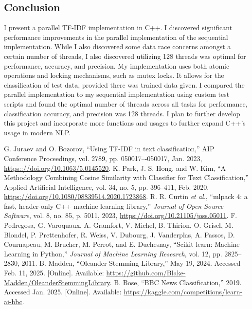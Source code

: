 \documentclass[conference]{IEEEtran}
\begin{document}
\subsection{Conclusion}
I present a parallel TF-IDF implementation in C++. I discovered significant performance improvements in the parallel implementation of the sequential implementation. While I also discovered some data race concerns amongst a certain number of threads, I also discovered utilizing 128 threads was optimal for performance, accuracy, and precision. My implementation uses both atomic operations and locking mechanisms, such as mutex locks. It allows for the classification of test data, provided there was trained data given. I compared the parallel implementation to my sequential implementation using custom test scripts and found the optimal number of threads across all tasks for performance, classification accuracy, and precision was 128 threads. I plan to further develop this project and incorporate more functions and usages to further expand C++’s usage in modern NLP.

\begin{thebibliography}{00}
 G. Juraev and O. Bozorov, ``Using TF-IDF in text classification,'' AIP Conference Proceedings, vol. 2789, pp. 050017–-050017, Jan. 2023, \url{https:://doi.org/10.1063/5.0145520}.
 K. Park, J. S. Hong, and W. Kim, ``A Methodology Combining Cosine Similarity with Classifier for Text Classification,'' Applied Artificial Intelligence, vol. 34, no. 5, pp. 396--411, Feb. 2020, \url{https://doi.org/10.1080/08839514.2020.1723868}.
 R. R. Curtin \textit{et al.}, ``mlpack 4: a fast, header-only C++ machine learning library,'' \textit{Journal of Open Source Software}, vol. 8, no. 85, p. 5011, 2023, \url{https://doi.org/10.21105/joss.05011}.
 F. Pedregosa, G. Varoquaux, A. Gramfort, V. Michel, B. Thirion, O. Grisel, M. Blondel, P. Prettenhofer, R. Weiss, V. Dubourg, J. Vanderplas, A. Passos, D. Cournapeau, M. Brucher, M. Perrot, and E. Duchesnay, ``Scikit-learn: Machine Learning in Python,'' \textit{Journal of Machine Learning Research}, vol. 12, pp. 2825--2830, 2011.
 B. Madden, ``Oleander Stemming Library,'' May 19, 2024. Accessed Feb. 11, 2025. [Online]. Available: \url{https://github.com/Blake-Madden/OleanderStemmingLibrary}.
B. Bose, ``BBC News Classification,'' 2019. Accessed Jan. 2025. [Online]. Available: \url{https://kaggle.com/competitions/learn-ai-bbc}.
\end{thebibliography}
\end{document}
